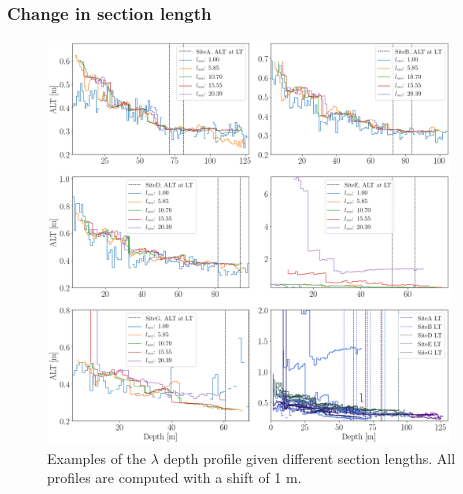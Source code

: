 \documentclass[../../CompleteThesis2/Complete_2ndDraft]{subfiles}
\begin{document}
\subsubsection[Change in $l_{sec}$]{Change in section length}
\label{Subsubsec:Method_TestStab_ALTest_ChangeLsec}

\begin{figure}[h]
	\centering
	\includegraphics[width=0.95\textwidth]{AllCores_ALT_at_DiffLsecs.png}
	\caption[$\lambda$ Depth Profiles, Different $l_{\text{sec}}$]{\small Examples of the $\lambda$ depth profile given different section lengths. All profiles are computed with a shift of 1 m.}
	\label{fig:AllCores_ALT_at_DiffLsecs}
\end{figure}
\end{document}
